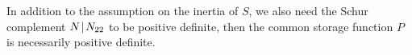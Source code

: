 

\begin{lemma}
\label{ch5:lem:P>0}
In addition to the assumption on the inertia of $S$, we also need the Schur complement $N \!\mid\! N_{22} $ to be positive definite, then the common storage function $P$ is necessarily positive	definite.
\end{lemma}

